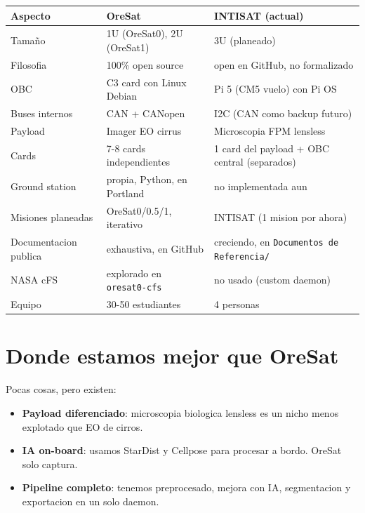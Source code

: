 \documentclass[11pt,a4paper,oneside]{report}
\begin{document}
\begin{center}
\begin{tabular}{p{4cm}p{4.5cm}p{4.5cm}}
\toprule
\textbf{Aspecto} & \textbf{OreSat} & \textbf{INTISAT (actual)} \\
\midrule
Tamaño                   & 1U (OreSat0), 2U (OreSat1)     & 3U (planeado) \\
Filosofia                & 100\% open source               & open en GitHub, no formalizado \\
OBC                      & C3 card con Linux Debian        & Pi 5 (CM5 vuelo) con Pi OS \\
Buses internos           & CAN + CANopen                   & I2C (CAN como backup futuro) \\
Payload                  & Imager EO cirrus               & Microscopia FPM lensless \\
Cards                    & 7-8 cards independientes        & 1 card del payload + OBC central (separados) \\
Ground station           & propia, Python, en Portland     & no implementada aun \\
Misiones planeadas       & OreSat0/0.5/1, iterativo        & INTISAT (1 mision por ahora) \\
Documentacion publica    & exhaustiva, en GitHub           & creciendo, en \texttt{Documentos de Referencia/} \\
NASA cFS                 & explorado en \texttt{oresat0-cfs} & no usado (custom daemon) \\
Equipo                   & 30-50 estudiantes               & 4 personas \\
\bottomrule
\end{tabular}
\end{center}

\section{Donde estamos mejor que OreSat}

Pocas cosas, pero existen:

\begin{itemize}[leftmargin=2em]
  \item \textbf{Payload diferenciado}: microscopia biologica lensless es
        un nicho menos explotado que EO de cirros.
  \item \textbf{IA on-board}: usamos StarDist y Cellpose para procesar a
        bordo. OreSat solo captura.
  \item \textbf{Pipeline completo}: tenemos preprocesado, mejora con IA,
        segmentacion y exportacion en un solo daemon.
\end{itemize}
\end{document}
